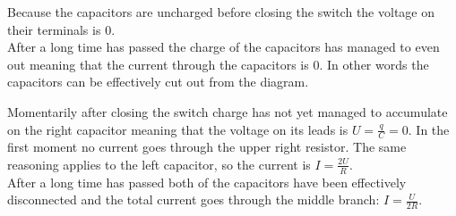 \hinteng
Because the capacitors are uncharged before closing the switch the voltage on their terminals is $0$.\\
After a long time has passed the charge of the capacitors has managed to even out meaning that the current through the capacitors is $0$. In other words the capacitors can be effectively cut out from the diagram.

\solueng
Momentarily after closing the switch charge has not yet managed to accumulate on the right capacitor meaning that the voltage on its leads is $U=\frac{q}{C}=0$. In the first moment no current goes through the upper right resistor. The same reasoning applies to the left capacitor, so the current is $I=\frac{2U}{R}$.\\
After a long time has passed both of the capacitors have been effectively disconnected and the total current goes through the middle branch: $I=\frac{U}{2R}$.
\probend